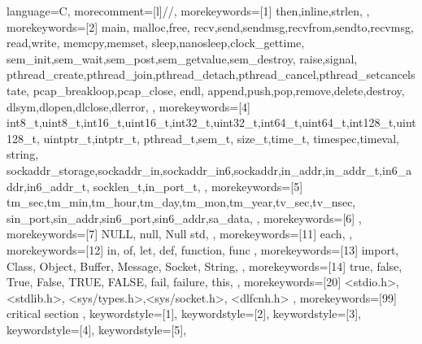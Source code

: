 {%
	language=C,%
	morecomment=[l]{//},%
	morekeywords=[1]{%
		then,inline,strlen,%
	},%
	morekeywords=[2]{%
		main,
		malloc,free,%
		recv,send,sendmsg,recvfrom,sendto,recvmsg,
		read,write,
		memcpy,memset,
		sleep,nanosleep,clock_gettime,
		sem_init,sem_wait,sem_post,sem_getvalue,sem_destroy,
		raise,signal,
		pthread_create,pthread_join,pthread_detach,pthread_cancel,pthread_setcancelstate,
		pcap_breakloop,pcap_close,
		endl,
		append,push,pop,remove,delete,destroy,
		dlsym,dlopen,dlclose,dlerror,
	},%
	morekeywords=[4]{%
		int8_t,uint8_t,int16_t,uint16_t,int32_t,uint32_t,int64_t,uint64_t,int128_t,uint128_t,
		uintptr_t,intptr_t,
		pthread_t,sem_t,
		size_t,time_t,
		timespec,timeval,
		string,
		sockaddr_storage,sockaddr_in,sockaddr_in6,sockaddr,in_addr,in_addr_t,in6_addr,in6_addr_t,
		socklen_t,in_port_t,
	},%
	morekeywords=[5]{%
		tm_sec,tm_min,tm_hour,tm_day,tm_mon,tm_year,tv_sec,tv_nsec,
		sin_port,sin_addr,sin6_port,sin6_addr,sa_data,
	},%
	morekeywords=[6]{%
	},%
	morekeywords=[7]{%
		NULL, null, Null
		std,
	},%
	morekeywords=[11]{%
		each,
	},%
	morekeywords=[12]{%
		in, of, let, def,
		function, func
	},%
	morekeywords=[13]{%
		import,
		Class, Object,
		Buffer, Message,
		Socket, String,
	},%
	morekeywords=[14]{%
		true, false, True, False, TRUE, FALSE,
		fail, failure,
		this,
	},%
	morekeywords=[20]{%
		<stdio.h>,<stdlib.h>,
		<sys/types.h>,<sys/socket.h>,
		<dlfcnh.h>
	},%
	morekeywords=[99]{%
		critical section
	},%
	keywordstyle=[1]\lstCFontBasic,%
	keywordstyle=[2]\lstCFontPredefLib,%
	keywordstyle=[3]\lstCFontFuncCall,%
	keywordstyle=[4]\lstCFontType,%
	keywordstyle=[5]\lstCFontCollection,%
}
